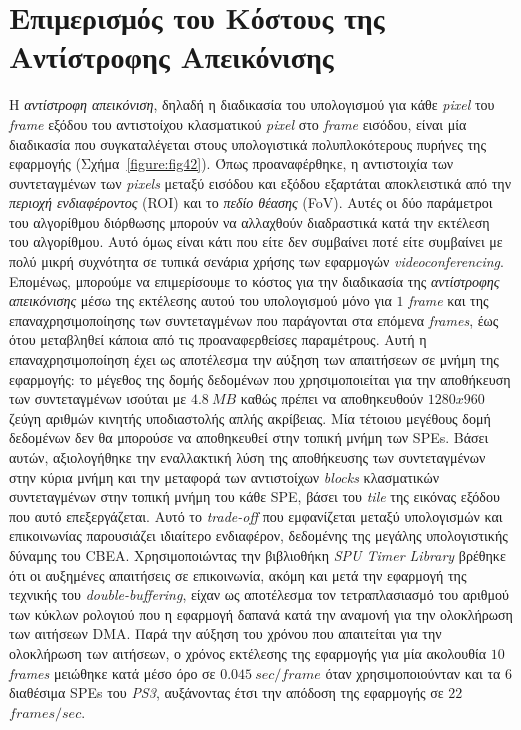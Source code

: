 \section{Επιμερισμός του Κόστους της Αντίστροφης Απεικόνισης}
\label{section:sect52}
\indent
Η \textsl{αντίστροφη απεικόνιση}, δηλαδή η διαδικασία του υπολογισμού για κάθε \textsl{pixel} του \textsl{frame} εξόδου του αντιστοίχου κλασματικού \textsl{pixel} στο \textsl{frame} εισόδου, είναι μία διαδικασία που συγκαταλέγεται στους υπολογιστικά πολυπλοκότερους πυρήνες της εφαρμογής (Σχήμα~\ref{figure:fig42}). Όπως προαναφέρθηκε, η αντιστοιχία των συντεταγμένων των \textsl{pixels} μεταξύ εισόδου και εξόδου εξαρτάται αποκλειστικά από την \textsl{περιοχή ενδιαφέροντος} (\ac{ROI}) και το \textsl{πεδίο θέασης} (\ac{FoV}). Αυτές οι δύο παράμετροι του αλγορίθμου διόρθωσης μπορούν να αλλαχθούν διαδραστικά κατά την εκτέλεση του αλγορίθμου. Αυτό όμως είναι κάτι που είτε δεν συμβαίνει ποτέ είτε συμβαίνει με πολύ μικρή συχνότητα σε τυπικά σενάρια χρήσης των εφαρμογών \textsl{videoconferencing}. Επομένως, μπορούμε να επιμερίσουμε το κόστος για την διαδικασία της \textsl{αντίστροφης απεικόνισης} μέσω της εκτέλεσης αυτού του υπολογισμού μόνο για \(1\) \textsl{frame} και της επαναχρησιμοποίησης των συντεταγμένων που παράγονται στα επόμενα \textsl{frames}, έως ότου μεταβληθεί κάποια από τις προαναφερθείσες παραμέτρους.\newline \indent 
Αυτή η επαναχρησιμοποίηση έχει ως αποτέλεσμα την αύξηση των απαιτήσεων σε μνήμη της εφαρμογής: το μέγεθος της δομής δεδομένων που χρησιμοποιείται για την αποθήκευση των συντεταγμένων ισούται με \(4.8\ MB\) καθώς πρέπει να αποθηκευθούν \(1280x960\) ζεύγη αριθμών κινητής υποδιαστολής απλής ακρίβειας. Μία τέτοιου μεγέθους δομή δεδομένων δεν θα μπορούσε να αποθηκευθεί στην τοπική μνήμη των \acp{SPE}. Βάσει αυτών, αξιολογήθηκε την εναλλακτική λύση της αποθήκευσης των συντεταγμένων στην κύρια μνήμη και την μεταφορά των αντιστοίχων \textsl{blocks} κλασματικών συντεταγμένων στην τοπική μνήμη του κάθε \ac{SPE}, βάσει του \textsl{tile} της εικόνας εξόδου που αυτό επεξεργάζεται.\newline \indent
Αυτό το \textsl{trade-off} που εμφανίζεται μεταξύ υπολογισμών και επικοινωνίας παρουσιάζει ιδιαίτερο ενδιαφέρον, δεδομένης της μεγάλης υπολογιστικής δύναμης του \ac{CBEA}. Χρησιμοποιώντας την βιβλιοθήκη \textsl{SPU Timer Library} \cite{CellTimersLib} βρέθηκε ότι οι αυξημένες απαιτήσεις σε επικοινωνία, ακόμη και μετά την εφαρμογή της τεχνικής του \textsl{double-buffering}, είχαν ως αποτέλεσμα τον τετραπλασιασμό του αριθμού των κύκλων ρολογιού που η εφαρμογή δαπανά κατά την αναμονή για την ολοκλήρωση των αιτήσεων \ac{DMA}. Παρά την αύξηση του χρόνου που απαιτείται για την ολοκλήρωση των αιτήσεων, ο χρόνος εκτέλεσης της εφαρμογής για μία ακολουθία \(10\) \textsl{frames} μειώθηκε κατά μέσο όρο σε \(0.045\ sec/frame\) όταν χρησιμοποιούνταν και τα \(6\) διαθέσιμα \acp{SPE} του \textsl{PS3}, αυξάνοντας έτσι την απόδοση της εφαρμογής σε \(22\) \(frames/sec\).\newline \indent 
